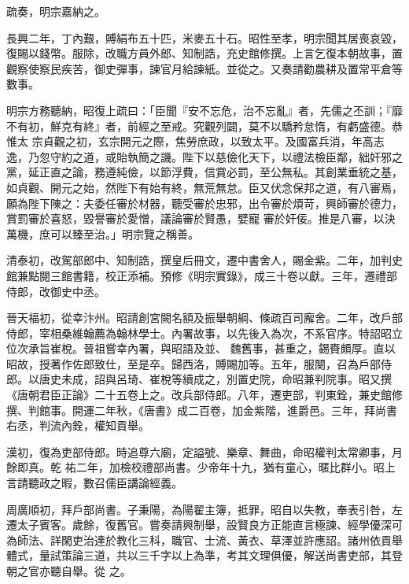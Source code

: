 \begin{pinyinscope}
 疏奏，明宗嘉納之。



 長興二年，丁內艱，賻絹布五十匹，米麥五十石。昭性至孝，明宗聞其居喪哀毀，復賜以錢幣。服除，改職方員外郎、知制誥，充史館修撰。上言乞復本朝故事，置觀察使察民疾苦，御史彈事，諫官月給諫紙。並從之。又奏請勸農耕及置常平倉等數事。



 明宗方務聽納，昭復上疏曰：「臣聞『安不忘危，治不忘亂』者，先儒之丕訓；『靡不有初，鮮克有終』者，前經之至戒。究觀列闢，莫不以驕矜怠惰，有虧盛德。恭惟太
 宗貞觀之初，玄宗開元之際，焦勞庶政，以致太平。及國富兵消，年高志逸，乃忽守約之道，或貽執簡之譏。陛下以慈儉化天下，以禮法檢臣鄰，絀奸邪之黨，延正直之論，務遵純儉，以節浮費，信賞必罰，至公無私。其創業垂統之基，如貞觀、開元之始，然陛下有始有終，無荒無怠。臣又伏念保邦之道，有八審焉，願為陛下陳之：夫委任審於材器，聽受審於忠邪，出令審於煩苛，興師審於德力，賞罰審於喜怒，毀譽審於愛憎，議論審於賢愚，嬖寵
 審於奸佞。推是八審，以決萬機，庶可以臻至治。」明宗覽之稱善。



 清泰初，改駕部郎中、知制誥，撰皇后冊文，遷中書舍人，賜金紫。二年，加判史館兼點閱三館書籍，校正添補。預修《明宗實錄》，成三十卷以獻。三年，遷禮部侍郎，改御史中丞。



 晉天福初，從幸汴州。昭請創宮闕名額及振舉朝綱、條疏百司廨舍。二年，改戶部侍郎，宰相桑維翰薦為翰林學士。內署故事，以先後入為次，不系官序。特詔昭立位次承旨崔梲。晉祖嘗幸內署，與昭語及並、
 魏舊事，甚重之，錫賚頗厚。直以昭故，授著作佐郎致仕，至是卒。歸西洛，賻賜加等。五年，服闋，召為戶部侍郎。以唐史未成，詔與呂琦、崔梲等續成之，別置史院，命昭兼判院事。昭又撰《唐朝君臣正論》二十五卷上之。改兵部侍郎。八年，遷吏部，判東銓，兼史館修撰、判館事。開運二年秋，《唐書》成二百卷，加金紫階，進爵邑。三年，拜尚書右丞，判流內銓，權知貢舉。



 漢初，復為吏部侍郎。時追尊六廟，定謚號、樂章、舞曲，命昭權判太常卿事，月餘即真。乾
 祐二年，加檢校禮部尚書。少帝年十九，猶有童心，暱比群小。昭上言請聽政之暇，數召儒臣講論經義。



 周廣順初，拜戶部尚書。子秉陽，為陽翟主簿，抵罪，昭自以失教，奉表引咎，左遷太子賓客。歲餘，復舊官。嘗奏請興制舉，設賢良方正能直言極諫、經學優深可為師法、詳閑吏治達於教化三科，職官、士流、黃衣、草澤並許應詔。諸州依貢舉體式，量試策論三道，共以三千字以上為準，考其文理俱優，解送尚書吏部，其登朝之官亦聽自舉。從
 之。




\end{pinyinscope}

